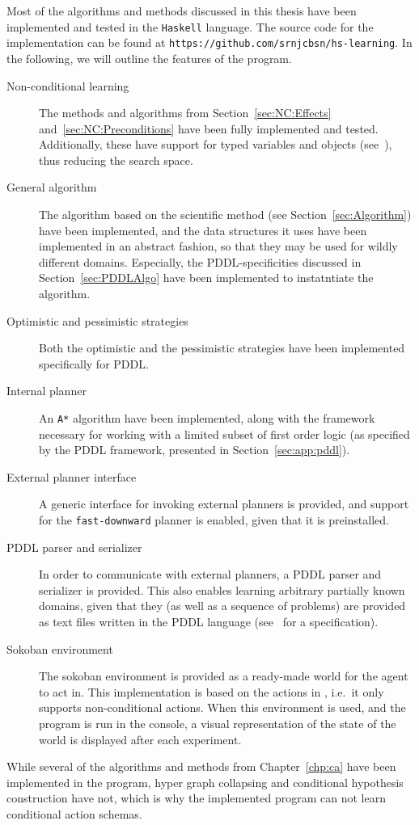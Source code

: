 \documentclass[../Master.tex]{subfiles}
\begin{document}
Most of the algorithms and methods discussed in this thesis have been implemented and tested in the \texttt{Haskell} language. The source code for the implementation can be found at \texttt{https://github.com/srnjcbsn/hs-learning}. In the following, we will outline the features of the program.

\begin{description}
    \item[Non-conditional learning] 
        The methods and algorithms from Section~\ref{sec:NC:Effects} and~\ref{sec:NC:Preconditions} have been fully implemented and tested. Additionally, these have support for typed variables and objects (see~\cite{PDDL}), thus reducing the search space.
    \item[General algorithm]
        The algorithm based on the scientific method (see Section~\ref{sec:Algorithm}) have been implemented, and the data structures it uses have been implemented in an abstract fashion, so that they may be used for wildly different domains. Especially, the PDDL-specificities discussed in Section~\ref{sec:PDDLAlgo} have been implemented to instatntiate the algorithm.
    \item[Optimistic and pessimistic strategies]
        Both the optimistic and the pessimistic strategies have been implemented specifically for PDDL.
    \item[Internal planner] An \texttt{A*} algorithm have been implemented, along with the framework necessary for working with a limited subset of first order logic (as specified by the PDDL framework, presented in Section~\ref{sec:app:pddl}).
    \item[External planner interface] A generic interface for invoking external planners is provided, and support for the \texttt{fast-downward} planner is enabled, given that it is preinstalled.
    \item[PDDL parser and serializer]
        In order to communicate with external planners, a PDDL parser and serializer is provided. This also enables learning arbitrary partially known domains, given that they (as well as a sequence of problems) are provided as text files written in the PDDL language (see~\cite{PDDL} for a specification).
    \item[Sokoban environment]
        The sokoban environment is provided as a ready-made world for the agent to act in. This implementation is based on the actions in , i.e.\ it only supports non-conditional actions. When this environment is used, and the program is run in the console, a visual representation of the state of the world is displayed after each experiment.
\end{description}

While several of the algorithms and methods from Chapter~\ref{chp:ca} have been implemented in the program, hyper graph collapsing and conditional hypothesis construction have not, which is why the implemented program can not learn conditional action schemas.
\end{document}
